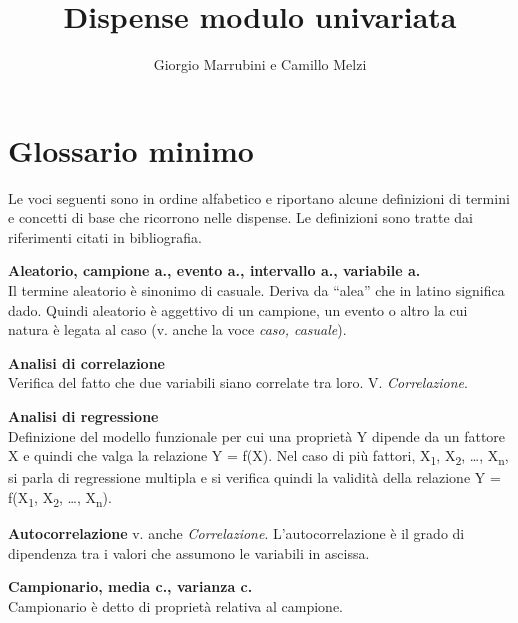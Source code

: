 \documentclass[
  11pt,
]{book}
\title{Dispense modulo univariata}
\author{Giorgio Marrubini e Camillo Melzi}
\date{}
\begin{document}
\maketitle

{
\hypersetup{linkcolor=}
\setcounter{tocdepth}{1}
\tableofcontents
}
\hypertarget{section}{%
\chapter*{}\label{section}}

\hypertarget{glossario}{%
\chapter*{Glossario minimo}\label{glossario}}

Le voci seguenti sono in ordine alfabetico e riportano alcune definizioni di termini e concetti di base che ricorrono nelle dispense.
Le definizioni sono tratte dai riferimenti citati in bibliografia.
\citep{legarzantine2014, everittb.s.skrondala.2010, wonnacottt.h.wonnacottr.j.2002}

\textbf{Aleatorio, campione a., evento a., intervallo a., variabile a.}\\
Il termine aleatorio è sinonimo di casuale.
Deriva da ``alea'' che in latino significa dado.
Quindi aleatorio è aggettivo di un campione, un evento o altro la cui natura è legata al caso (v. anche la voce \emph{caso, casuale}).

\textbf{Analisi di correlazione}\\
Verifica del fatto che due variabili siano correlate tra loro.
V. \emph{Correlazione}.

\textbf{Analisi di regressione}\\
Definizione del modello funzionale per cui una proprietà Y dipende da un fattore X e quindi che valga la relazione Y = f(X).
Nel caso di più fattori, X\textsubscript{1}, X\textsubscript{2}, \ldots, X\textsubscript{n}, si parla di regressione multipla e si verifica quindi la validità della relazione Y = f(X\textsubscript{1}, X\textsubscript{2}, \ldots, X\textsubscript{n}).

\textbf{Autocorrelazione} v. anche \emph{Correlazione}.
L'autocorrelazione è il grado di dipendenza tra i valori che assumono le variabili in ascissa.

\textbf{Campionario, media c., varianza c.}\\
Campionario è detto di proprietà relativa al campione.
\end{document}
